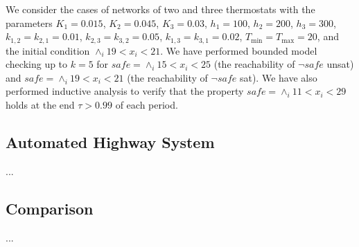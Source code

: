We consider the cases of networks of two and three thermostats
with the parameters
$K_1 = 0.015$, 
$K_2 = 0.045$, 
$K_3 = 0.03$, 
$h_1 = 100$,
$h_2 = 200$,
$h_3 = 300$,
$k_{1,2} = k_{2,1} = 0.01$,
$k_{2,3} = k_{3,2} = 0.05$,
$k_{1,3} = k_{3,1} = 0.02$,
$T_{\min} = T_{\max} = 20$,
and the initial condition $\wedge_{i} 19 < x_i < 21$.
We have performed bounded model checking up to $k = 5$
for $\mathit{safe} = \wedge_{i} 15 < x_i < 25$ 
(the reachability of $\neg\mathit{safe}$ unsat)
and $\mathit{safe} = \wedge_{i} 19 < x_i < 21$ 
(the reachability of $\neg\mathit{safe}$ sat).
We have also performed 
inductive analysis 
to verify that the property $\mathit{safe} = \wedge_{i} 11 < x_i < 29$
holds at the end $\tau > 0.99$ of each period.

\subsection{Automated Highway System}

...





\subsection{Comparison}

...


